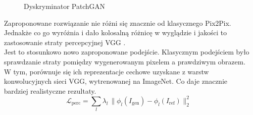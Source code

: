 \documentclass[12pt]{article}
\begin{document}
\begin{sloppypar}
{{\begin{figure}[H]
      \caption{Dyskryminator PatchGAN}
      \label{fig:discriminator}
    \end{figure}
    Zaproponowane rozwiązanie nie różni się znacznie od klasycznego Pix2Pix. 
    Jednakże co go wyróżnia i dało kolosalną różnicę w wyglądzie i jakości to zastosowanie straty percepcyjnej VGG \cite{vgg}. \\
    Jest to stosunkowo nowo zaproponowane podejście. Klasycznym podejściem było sprawdzanie straty pomiędzy wygenerowanym pixelem a prawdziwym obrazem. 
    W tym, porównuje się ich reprezentacje cechowe uzyskane z warstw konwolucyjnych sieci VGG, wytrenowanej na ImageNet. 
    Co daje znacznie bardziej realistyczne rezultaty. \\
    \[ \mathcal{L}_{\text{perc}} = \sum_{l} \lambda_l \, \| \phi_l(I_{\text{gen}}) - \phi_l(I_{\text{ref}}) \|_2^2 \]
  }
}
\end{sloppypar}
\end{document}
